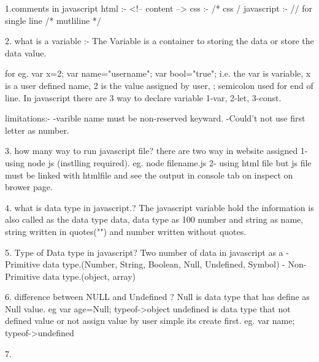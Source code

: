 1.comments in javascript
    html       :- <!--  content  -->
    css        :- /* css /
    javascript :- // for single line
                    /* mutliline */

2. what is a variable :-
                The Variable is a container to storing the data or store the data value.
                
                for eg. var x=2;    var name="username";    var bool="true";
                    i.e. the var is variable, x is a user defined name, 2 is the value assigned by user, ; semicolon used for end of line.
                In javascript there are 3 way to declare variable 1-var, 2-let, 3-const.

            limitations:- 
                -varible name must be non-reserved keyward.
                -Could't not use first letter as number.
            
3. how many way to run javascript file?
    there are two way in website assigned   
        1- using node js (instlling required).
        eg. node filename.js
        2- using html file but js file must be linked with htmlfile and see the output in console tab on inspect on brower page.

4. what is data type in javascript.?
    The javascript variable hold the information is also called as the data type data,
    data type  as 100 number and string as name,  string written in quotes("") and number written without quotes. 
    
5. Type of Data type in javascript?
    Two number of data in javascript as a
        - Primitive data type.(Number, String, Boolean, Null, Undefined, Symbol)
        - Non-Primitive data type.(object, array)

6. difference between NULL and Undefined ?
    Null is data type that has define as Null value.
    eg var age=Null;  typeof->object
    undefined is data type that not defined value or not assign value by user simple its create first.  
    eg. var name;  typeof->undefined       

7.  